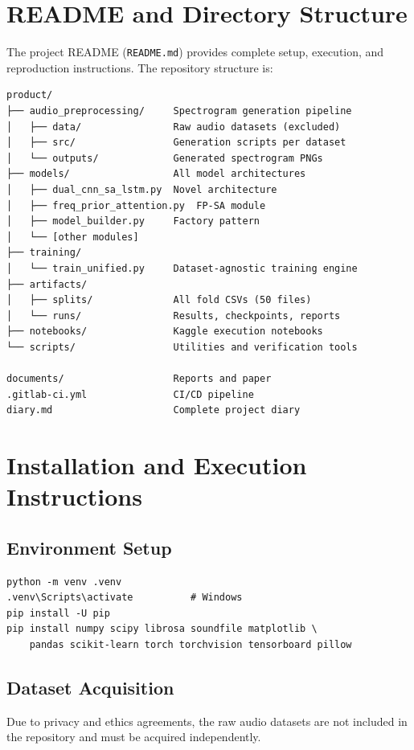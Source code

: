 \documentclass[oneside,openany]{final_report}
\begin{document}
\appendix

\chapter{README and Directory Structure}

The project README (\texttt{README.md}) provides complete setup, execution, and reproduction instructions. The repository structure is:

\begin{verbatim}
product/
├── audio_preprocessing/     Spectrogram generation pipeline
│   ├── data/                Raw audio datasets (excluded)
│   ├── src/                 Generation scripts per dataset
│   └── outputs/             Generated spectrogram PNGs
├── models/                  All model architectures
│   ├── dual_cnn_sa_lstm.py  Novel architecture
│   ├── freq_prior_attention.py  FP-SA module
│   ├── model_builder.py     Factory pattern
│   └── [other modules]
├── training/
│   └── train_unified.py     Dataset-agnostic training engine
├── artifacts/
│   ├── splits/              All fold CSVs (50 files)
│   └── runs/                Results, checkpoints, reports
├── notebooks/               Kaggle execution notebooks
└── scripts/                 Utilities and verification tools

documents/                   Reports and paper
.gitlab-ci.yml               CI/CD pipeline
diary.md                     Complete project diary
\end{verbatim}

\chapter{Installation and Execution Instructions}

\section{Environment Setup}
\begin{verbatim}
python -m venv .venv
.venv\Scripts\activate          # Windows
pip install -U pip
pip install numpy scipy librosa soundfile matplotlib \
    pandas scikit-learn torch torchvision tensorboard pillow
\end{verbatim}

\section{Dataset Acquisition}
Due to privacy and ethics agreements, the raw audio datasets are not included in the repository and must be acquired independently.
\end{document}
